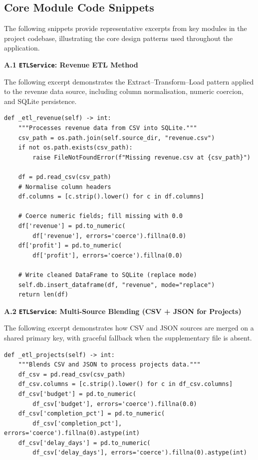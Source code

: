 \documentclass{book}
\begin{document}
\begin{appendices}
\chapter{Core Module Code Snippets}

The following snippets provide representative excerpts from key modules in the project codebase, illustrating the core design patterns used throughout the application.

\vspace{0.5cm}
\noindent\textbf{A.1 \texttt{ETLService}: Revenue ETL Method}

\noindent The following excerpt demonstrates the Extract--Transform--Load pattern applied to the revenue data source, including column normalisation, numeric coercion, and SQLite persistence.

\begin{verbatim}
def _etl_revenue(self) -> int:
    """Processes revenue data from CSV into SQLite."""
    csv_path = os.path.join(self.source_dir, "revenue.csv")
    if not os.path.exists(csv_path):
        raise FileNotFoundError(f"Missing revenue.csv at {csv_path}")

    df = pd.read_csv(csv_path)
    # Normalise column headers
    df.columns = [c.strip().lower() for c in df.columns]

    # Coerce numeric fields; fill missing with 0.0
    df['revenue'] = pd.to_numeric(
        df['revenue'], errors='coerce').fillna(0.0)
    df['profit'] = pd.to_numeric(
        df['profit'], errors='coerce').fillna(0.0)

    # Write cleaned DataFrame to SQLite (replace mode)
    self.db.insert_dataframe(df, "revenue", mode="replace")
    return len(df)
\end{verbatim}

\vspace{0.5cm}
\noindent\textbf{A.2 \texttt{ETLService}: Multi-Source Blending (CSV + JSON for Projects)}

\noindent The following excerpt demonstrates how CSV and JSON sources are merged on a shared primary key, with graceful fallback when the supplementary file is absent.

\begin{verbatim}
def _etl_projects(self) -> int:
    """Blends CSV and JSON to process projects data."""
    df_csv = pd.read_csv(csv_path)
    df_csv.columns = [c.strip().lower() for c in df_csv.columns]
    df_csv['budget'] = pd.to_numeric(
        df_csv['budget'], errors='coerce').fillna(0.0)
    df_csv['completion_pct'] = pd.to_numeric(
        df_csv['completion_pct'], errors='coerce').fillna(0).astype(int)
    df_csv['delay_days'] = pd.to_numeric(
        df_csv['delay_days'], errors='coerce').fillna(0).astype(int)


\end{verbatim}
\end{appendices}
\end{document}
